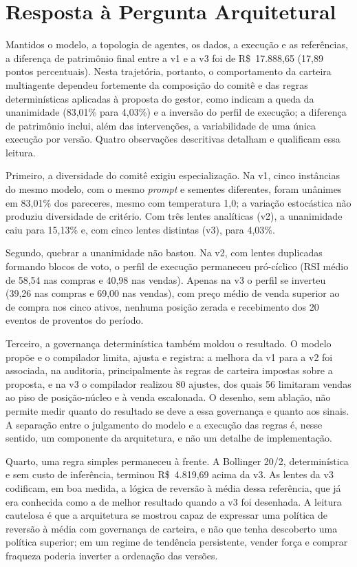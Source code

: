 \section{Resposta à Pergunta Arquitetural}

Mantidos o modelo, a topologia de agentes, os dados, a execução e as referências, a diferença de patrimônio final entre a v1 e a v3 foi de R\$~17.888,65 (17,89 pontos percentuais). Nesta trajetória, portanto, o comportamento da carteira multiagente dependeu fortemente da composição do comitê e das regras determinísticas aplicadas à proposta do gestor, como indicam a queda da unanimidade (83,01\% para 4,03\%) e a inversão do perfil de execução; a diferença de patrimônio inclui, além das intervenções, a variabilidade de uma única execução por versão. Quatro observações descritivas detalham e qualificam essa leitura.

Primeiro, a diversidade do comitê exigiu especialização. Na v1, cinco instâncias do mesmo modelo, com o mesmo \textit{prompt} e sementes diferentes, foram unânimes em 83,01\% dos pareceres, mesmo com temperatura 1,0; a variação estocástica não produziu diversidade de critério. Com três lentes analíticas (v2), a unanimidade caiu para 15,13\% e, com cinco lentes distintas (v3), para 4,03\%.

Segundo, quebrar a unanimidade não bastou. Na v2, com lentes duplicadas formando blocos de voto, o perfil de execução permaneceu pró-cíclico (RSI médio de 58,54 nas compras e 40,98 nas vendas). Apenas na v3 o perfil se inverteu (39,26 nas compras e 69,00 nas vendas), com preço médio de venda superior ao de compra nos cinco ativos, nenhuma posição zerada e recebimento dos 20 eventos de proventos do período.

Terceiro, a governança determinística também moldou o resultado. O modelo propõe e o compilador limita, ajusta e registra: a melhora da v1 para a v2 foi associada, na auditoria, principalmente às regras de carteira impostas sobre a proposta, e na v3 o compilador realizou 80 ajustes, dos quais 56 limitaram vendas ao piso de posição-núcleo e à venda escalonada. O desenho, sem ablação, não permite medir quanto do resultado se deve a essa governança e quanto aos sinais. A separação entre o julgamento do modelo e a execução das regras é, nesse sentido, um componente da arquitetura, e não um detalhe de implementação.

Quarto, uma regra simples permaneceu à frente. A Bollinger 20/2, determinística e sem custo de inferência, terminou R\$~4.819,69 acima da v3. As lentes da v3 codificam, em boa medida, a lógica de reversão à média dessa referência, que já era conhecida como a de melhor resultado quando a v3 foi desenhada. A leitura cautelosa é que a arquitetura se mostrou capaz de expressar uma política de reversão à média com governança de carteira, e não que tenha descoberto uma política superior; em um regime de tendência persistente, vender força e comprar fraqueza poderia inverter a ordenação das versões.

